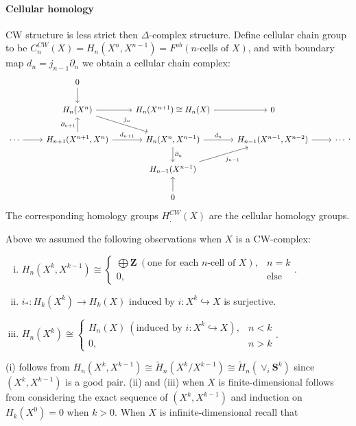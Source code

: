 \documentclass[11pt]{article}
\theoremstyle{definition}
\theoremstyle{plain}
\newcommand{\Z}{\mathbf{Z}}
\newcommand{\1}{\mathbf{1}}
\begin{document}
\paragraph{Cellular homology}

CW structure is less strict then $\Delta$-complex structure. Define cellular chain group to be $C_n^{CW}(X)=H_n(X^n,X^{n-1})=F^{ab}(n\textrm{-cells of }X)$, and with boundary map $d_n=j_{n-1}\partial_n$ we obtain a cellular chain complex:
\[\begin{tikzcd}[column sep=small]
&&0\arrow[d]&&&&&&\\
&&H_n(X^n)\arrow[rrd, "j_n"]\arrow[rr]&&H_n(X^{n+1})\cong H_n(X)\arrow[rr]&&0&&\\
\cdots\arrow[rr]&&{H_{n+1}(X^{n+1},X^n)}\arrow[u,"\partial_{n+1}"]\arrow[rr,"d_{n+1}"]&& {H_n(X^n,X^{n-1})}\arrow[rr, "d_n"] \arrow[d, "\partial_n"] &  & {H_{n-1}(X^{n-1},X^{n-2})} \arrow[rr]&&\cdots\\
&&&&H_{n-1}(X^{n-1})\arrow[rru,"j_{n-1}"']&&&&\\
&&&&0\arrow[u]&&&&       
\end{tikzcd}.\]
The corresponding homology groups $H_.^{CW}(X)$ are the cellular homology groups.\medbreak

Above we assumed the following observations when $X$ is a CW-complex:
\begin{enumerate}[(i)]
\item $H_n(X^k,X^{k-1})\cong\begin{cases}\bigoplus\Z\ (\textrm{one for each }n\textrm{-cell of }X),&n=k\\0,&\textrm{else}
\end{cases}$.

\item $i_\ast:H_k(X^k)\to H_k(X)$ induced by $i:X^k\hookrightarrow X$ is surjective.

\item $H_n(X^k)\cong\begin{cases}H_n(X)\ (\textrm{induced by }i:X^k\hookrightarrow X),&n<k\\0,&n>k
\end{cases}$.
\end{enumerate}
(i) follows from $H_n(X^k,X^{k-1})\cong\widetilde{H}_n(X^k/X^{k-1})\cong\widetilde{H}_n(\vee_i\mathbf{S}^k)$ since $(X^k,X^{k-1})$ is a good pair. (ii) and (iii) when $X$ is finite-dimensional follows from considering the exact sequence of $(X^k,X^{k-1})$ and induction on $H_k(X^0)=0$ when $k>0$. When $X$ is infinite-dimensional recall that\medbreak
\end{document}
